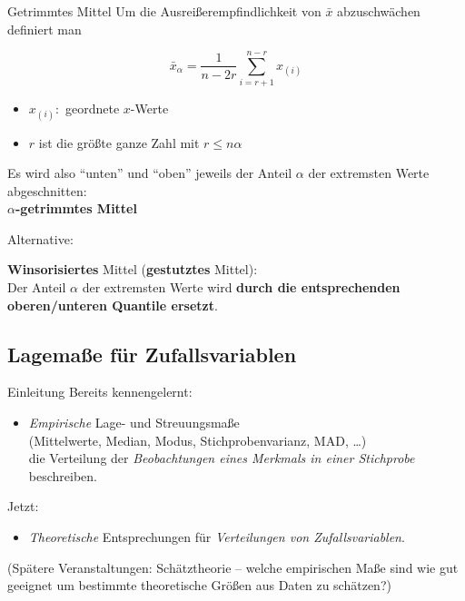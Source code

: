 \documentclass[
  10pt,
  ignorenonframetext,
]{beamer}
\providecommand{\tightlist}{%
  \setlength{\itemsep}{0pt}\setlength{\parskip}{0pt}}
\begin{document}
\begin{frame}{Getrimmtes Mittel}
\label{getrimmtes-mittel}
Um die Ausreißerempfindlichkeit von \(\bar x\) abzuschwächen definiert
man

\begin{equation*}
    \bar x_{\alpha} = \frac{1}{n-2r} \sum_{i=r+1}^{n-r} x_{(i)}
\end{equation*}

\begin{itemize}
\tightlist
\item
  \(x_{(i)}:\) geordnete \(x\)-Werte\\
\item
  \(r\) ist die größte ganze Zahl mit \(r \leq n \alpha\)
\end{itemize}

Es wird also ``unten'' und ``oben'' jeweils der Anteil \(\alpha\) der
extremsten Werte abgeschnitten:\\
\textbf{\(\alpha\)-getrimmtes Mittel}

Alternative:

\textbf{Winsorisiertes} Mittel (\textbf{gestutztes} Mittel):\\
Der Anteil \(\alpha\) der extremsten Werte wird \textbf{durch die
entsprechenden oberen/unteren Quantile ersetzt}.
\end{frame}

\subsection{Lagemaße für
Zufallsvariablen}\label{lagemauxdfe-fuxfcr-zufallsvariablen}

\begin{frame}{Einleitung}
\label{einleitung}
Bereits kennengelernt:

\begin{itemize}
\tightlist
\item
  \emph{Empirische} Lage- und Streuungsmaße\\
  (Mittelwerte, Median, Modus, Stichprobenvarianz, MAD, \ldots)\\
  die Verteilung der \emph{Beobachtungen eines Merkmals in einer
  Stichprobe} beschreiben.
\end{itemize}

Jetzt:

\begin{itemize}
\tightlist
\item
  \emph{Theoretische} Entsprechungen für \emph{Verteilungen von
  Zufallsvariablen}.
\end{itemize}

(Spätere Veranstaltungen: Schätztheorie -- welche empirischen Maße sind
wie gut geeignet um bestimmte theoretische Größen aus Daten zu
schätzen?)
\end{frame}
\end{document}
